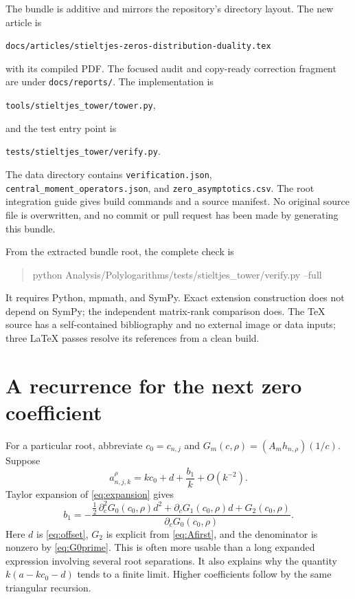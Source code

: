 \documentclass[11pt]{article}
\theoremstyle{definition}
\theoremstyle{remark}
\begin{document}
The bundle is additive and mirrors the repository's directory layout. The new article is
\begin{center}\small
\texttt{docs/articles/stieltjes-zeros-distribution-duality.tex}
\end{center}
with its compiled PDF. The focused audit and copy-ready correction fragment are under \texttt{docs/reports/}. The implementation is
\begin{center}\small\texttt{tools/stieltjes\_tower/tower.py},\end{center}
and the test entry point is
\begin{center}\small\texttt{tests/stieltjes\_tower/verify.py}.\end{center}
The data directory contains \texttt{verification.json}, \texttt{central\_moment\_operators.json}, and \texttt{zero\_asymptotics.csv}. The root integration guide gives build commands and a source manifest. No original source file is overwritten, and no commit or pull request has been made by generating this bundle.

From the extracted bundle root, the complete check is
\begin{quote}\small\ttfamily
python Analysis/Polylogarithms/tests/stieltjes\_tower/verify.py --full
\end{quote}
It requires Python, mpmath, and SymPy. Exact extension construction does not depend on SymPy; the independent matrix-rank comparison does. The TeX source has a self-contained bibliography and no external image or data inputs; three LaTeX passes resolve its references from a clean build.

\section{A recurrence for the next zero coefficient}
\label{app:nextzero}
For a particular root, abbreviate $c_0=c_{n,j}$ and
$G_m(c,\rho)=(A_mh_{n,\rho})(1/c)$. Suppose
\[
 a_{n,j,k}^{\rho}=kc_0+d+\frac{b_1}{k}+O(k^{-2}).
\]
Taylor expansion of \eqref{eq:expansion} gives
\begin{equation}\label{eq:b1}
 b_1=-\frac{\tfrac12\,\partial_c^2G_0(c_0,\rho)d^2
                +\partial_cG_1(c_0,\rho)d+G_2(c_0,\rho)}
               {\partial_cG_0(c_0,\rho)}.
\end{equation}
Here $d$ is \eqref{eq:offset}, $G_2$ is explicit from \eqref{eq:Afirst}, and the denominator is nonzero by \eqref{eq:G0prime}. This is often more usable than a long expanded expression involving several root separations. It also explains why the quantity $k(a-kc_0-d)$ tends to a finite limit. Higher coefficients follow by the same triangular recursion.
\end{document}
